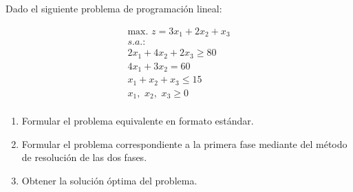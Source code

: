 Dado el siguiente problema de programación lineal:

\begin{equation}
\begin{split}
\mbox{max. } z = 3x_1 + 2x_2 + x_3\\
s.a.:\\
2x_1 + 4x_2 + 2x_3 \geq 80\\
4x_1 + 3x_2 = 60\\
 x_1 +  x_2 +  x_3 \leq 15\\
x_1,\,\,x_2,\,\,x_3\geq 0\\
\end{split}
\end{equation}

\begin{enumerate}

    \item Formular el problema equivalente en formato estándar.

    \item Formular el problema correspondiente a la primera fase mediante del método de resolución de las dos fases.

    \item Obtener la solución óptima del problema.
    
\end{enumerate}






